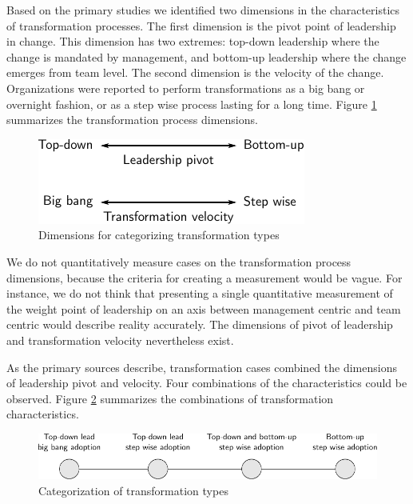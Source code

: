 Based on the primary studies we identified two dimensions in the characteristics
of transformation processes. The first dimension is the pivot point of
leadership in change. This dimension has two extremes: top-down leadership where
the change is mandated by management, and bottom-up leadership where the change
emerges from team level. The second dimension is the velocity of the change.
Organizations were reported to perform transformations as a big bang or
overnight fashion, or as a step wise process lasting for a long time. Figure
\ref{fig:transformation_dimensions} summarizes the transformation process
dimensions.

\begin{figure}[h]
  \begin{center}
    \includegraphics{graphics/transformation_dimensions.pdf}
    \caption{Dimensions for categorizing transformation types}
    \label{fig:transformation_dimensions}
  \end{center}
\end{figure}

We do not quantitatively measure cases on the transformation process dimensions,
because the criteria for creating a measurement would be vague. For instance, we
do not think that presenting a single quantitative measurement of the weight
point of leadership on an axis between management centric and team centric would
describe reality accurately. The dimensions of pivot of leadership and
transformation velocity nevertheless exist.

As the primary sources describe, transformation cases combined the dimensions of
leadership pivot and velocity. Four combinations of the characteristics could be
observed. Figure \ref{fig:transformation_types} summarizes the combinations of
transformation characteristics.

\begin{figure}[h]
  \begin{center}
    \includegraphics[width=1\textwidth]{graphics/transformation_process.pdf}
    \caption{Categorization of transformation types}
    \label{fig:transformation_types}
  \end{center}
\end{figure}

